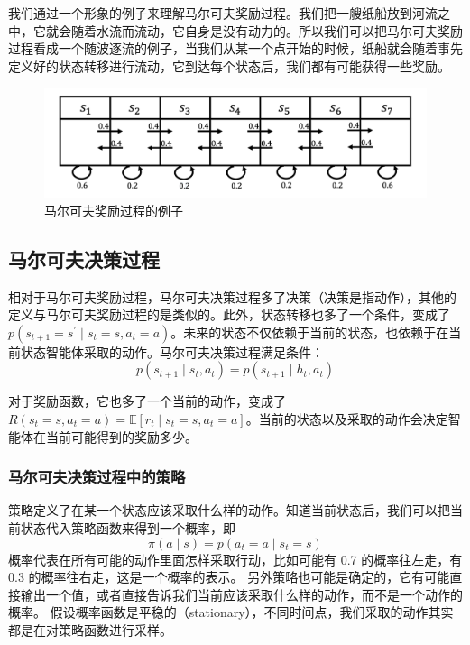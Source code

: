 我们通过一个形象的例子来理解马尔可夫奖励过程。我们把一艘纸船放到河流之中，它就会随着水流而流动，它自身是没有动力的。所以我们可以把马尔可夫奖励过程看成一个随波逐流的例子，当我们从某一个点开始的时候，纸船就会随着事先定义好的状态转移进行流动，它到达每个状态后，我们都有可能获得一些奖励。

\begin{figure}[hbt]
  \centering
  \includegraphics[width=0.5\linewidth]{ch2/figs/2.8}
  \caption{马尔可夫奖励过程的例子}
  \label{fig:mrp_example}
\end{figure}

\subsection{马尔可夫决策过程} 
相对于马尔可夫奖励过程，马尔可夫决策过程多了决策（决策是指动作），其他的定义与马尔可夫奖励过程的是类似的。此外，状态转移也多了一个条件，变成了$p\left(s_{t+1}=s^{\prime} \mid s_{t}=s,a_{t}=a\right)$。未来的状态不仅依赖于当前的状态，也依赖于在当前状态智能体采取的动作。马尔可夫决策过程满足条件：
\begin{equation}
  \label{eq:}
  p\left(s_{t+1} \mid s_{t}, a_{t}\right) =p\left(s_{t+1} \mid h_{t}, a_{t}\right)   
\end{equation}

对于奖励函数，它也多了一个当前的动作，变成了 $R\left(s_{t}=s, a_{t}=a\right)=\mathbb{E}\left[r_{t} \mid s_{t}=s, a_{t}=a\right]$。当前的状态以及采取的动作会决定智能体在当前可能得到的奖励多少。


\subsubsection{马尔可夫决策过程中的策略} 

策略定义了在某一个状态应该采取什么样的动作。知道当前状态后，我们可以把当前状态代入策略函数来得到一个概率，即 
\begin{equation}
  \pi(a \mid s)=p\left(a_{t}=a \mid s_{t}=s\right)
  \label{eq:}
\end{equation}
概率代表在所有可能的动作里面怎样采取行动，比如可能有 0.7 的概率往左走，有 0.3 的概率往右走，这是一个概率的表示。
另外策略也可能是确定的，它有可能直接输出一个值，或者直接告诉我们当前应该采取什么样的动作，而不是一个动作的概率。
假设概率函数是平稳的（stationary），不同时间点，我们采取的动作其实都是在对策略函数进行采样。

